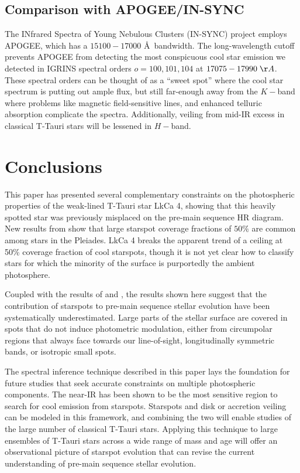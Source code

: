 \documentclass[twocolumn]{emulateapj}%
\begin{document}
\subsection{Comparison with APOGEE/IN-SYNC}
The INfrared Spectra of Young Nebulous Clusters (IN-SYNC) project \citep{cottaar14} employs APOGEE, which has a $15100-17000$ \AA\ bandwidth.  The long-wavelength cutoff prevents APOGEE from detecting the most conspicuous cool star emission we detected in IGRINS spectral orders $o = 100, 101, 104$ at $17075-17990 \;\AA$.  These spectral orders can be thought of as a ``sweet spot'' where the cool star spectrum is putting out ample flux, but still far-enough away from the $K-$band where problems like magnetic field-sensitive lines, and enhanced telluric absorption complicate the spectra.  Additionally, veiling from mid-IR excess in classical T-Tauri stars will be lessened in $H-$band.  

\section{Conclusions}
This paper has presented several complementary constraints on the photospheric properties of the weak-lined T-Tauri star LkCa 4, showing that this heavily spotted star was previously misplaced on the pre-main sequence HR diagram.  New results from \citet{fang2016} show that large starspot coverage fractions of $50\%$ are common among stars in the Pleiades.  LkCa 4 breaks the apparent trend of a ceiling at 50\% coverage fraction of cool starspots, though it is not yet clear how to classify stars for which the minority of the surface is purportedly the ambient photosphere.

Coupled with the results of \citet{fang2016} and \citet{covey16}, the results shown here suggest that the contribution of starspots to pre-main sequence stellar evolution have been systematically underestimated.  Large parts of the stellar surface are covered in spots that do not induce photometric modulation, either from circumpolar regions that always face towards our line-of-sight, longitudinally symmetric bands, or isotropic small spots.

The spectral inference technique described in this paper lays the foundation for future studies that seek accurate constraints on multiple photospheric components.  The near-IR has been shown to be the most sensitive region to search for cool emission from starspots.  Starspots and disk or accretion veiling can be modeled in this framework, and combining the two will enable studies of the large number of classical T-Tauri stars.  Applying this technique to large ensembles of T-Tauri stars across a wide range of mass and age will offer an observational picture of starspot evolution that can revise the current understanding of pre-main sequence stellar evolution.  
\end{document}
